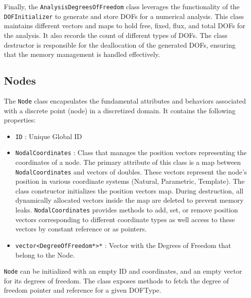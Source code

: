 \documentclass{article}
\begin{document}
	Finally, the \texttt{AnalysisDegreesOfFreedom} class leverages the functionality of the \texttt{DOFInitializer} to generate and store DOFs for a numerical analysis. This class maintains different vectors and maps to hold free, fixed, flux, and total DOFs for the analysis. It also records the count of different types of DOFs. The class destructor is responsible for the deallocation of the generated DOFs, ensuring that the memory management is handled effectively.	
	
	\subsection{Nodes}
	
	The \texttt{Node} class encapsulates the fundamental attributes and behaviors associated with a discrete point (node) in a discretized domain. It contains the following properties:
	\begin{itemize}
		\item \texttt{ID} : Unique Global ID
		
		\item \texttt{NodalCoordinates} : Class that manages the position vectors representing the coordinates of a node. The primary attribute of this class is a map between \texttt{NodalCoordinates} and vectors of doubles. These vectors represent the node's position in various coordinate systems (Natural, Parametric, Template). The class constructor initializes the position vectors map. During destruction, all dynamically allocated vectors inside the map are deleted to prevent memory leaks. \texttt{NodalCoordinates} provides methods to add, set, or remove position vectors corresponding to different coordinate types as well access to these vectors by constant reference or as pointers.
		
		\item \texttt{vector<DegreeOfFreedom*>*} : Vector with the Degrees of Freedom that belong to the Node.
		
	\end{itemize}
	
	\noindent \texttt{Node} can be initialized with an empty ID and coordinates, and an empty vector for its degrees of freedom. The class exposes methods to fetch the degree of freedom pointer and reference for a given DOFType. 
	
\end{document}
